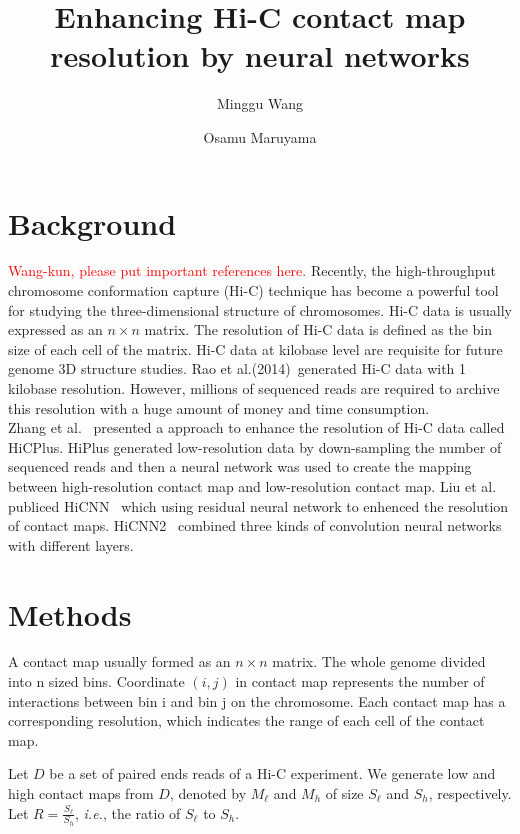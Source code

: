 \documentclass[a4paper,12pt]{article}
\begin{document}
\title{Enhancing Hi-C contact map resolution by neural networks}
\author{Minggu Wang \and Osamu Maruyama}
\maketitle

\section{Background}

\textcolor{red}{Wang-kun, please put important references here.}
Recently, the high-throughput chromosome conformation capture (Hi-C) technique has become a powerful tool for studying the three-dimensional structure of chromosomes. Hi-C data is usually expressed as an $n \times n$ matrix. The resolution of Hi-C data is defined as the bin size of each cell of the matrix. Hi-C data at kilobase level are requisite for future genome 3D structure studies. Rao et al.(2014)~\cite{Rao2014}generated Hi-C data with 1 kilobase resolution. However, millions of sequenced reads are required to archive this resolution with a huge amount of money and time consumption.\\
Zhang et al. ~\cite{Zhang2018}presented a approach to enhance the resolution of Hi-C data called HiCPlus. HiPlus generated low-resolution data by down-sampling the number of sequenced reads and then a neural network was used to create the mapping between high-resolution contact map and low-resolution contact map. 
Liu et al. publiced HiCNN~\cite{Liu2019} which using residual neural network to enhenced the resolution of contact maps. HiCNN2 ~\cite{Liu2019a}combined three kinds of convolution neural networks with different layers. 

\section{Methods}

A contact map usually formed as  an $n \times n$ matrix. The whole genome divided into n sized bins. Coordinate $(i,j)$ in contact map represents the number of interactions between bin i and bin j on the chromosome. Each contact map has a corresponding resolution, which indicates the range of each cell of the contact map.


Let $D$ be a set of paired ends reads of a Hi-C experiment. 
We generate low and high contact maps from $D$, 
denoted by $M_\ell$ and $M_h$ of size $S_\ell$ and $S_h$, respectively.  
Let $R = \frac{S_\ell}{S_h}$, \textit{i.e.}, 
the ratio of $S_\ell$ to $S_h$.  
\end{document}
